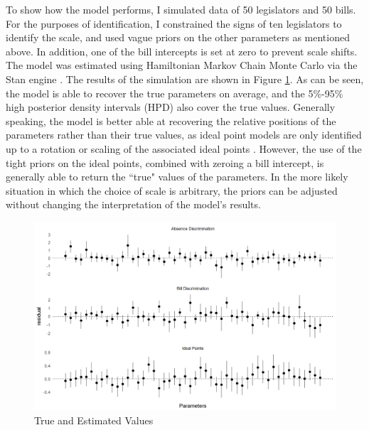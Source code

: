 	To show how the model performs, I simulated data of 50 legislators and 50 bills. For the purposes of identification, I constrained the signs of ten legislators to identify the scale, and used vague priors on the other parameters as mentioned above. In addition, one of the bill intercepts is set at zero to prevent scale shifts. The model was estimated using Hamiltonian Markov Chain Monte Carlo via the Stan engine \parencite{carpenter2017}. The results of the simulation are shown in Figure \ref{sim_results}. As can be seen, the model is able to recover the true parameters on average, and the 5\%-95\% high posterior density intervals (HPD) also cover the true values. Generally speaking, the model is better able at recovering the relative positions of the parameters rather than their true values, as ideal point models are only identified up to a rotation or scaling of the associated ideal points \parencite{gelman2005}. However, the use of the tight priors on the ideal points, combined with zeroing a bill intercept, is generally able to return the ``true" values of the parameters. In the more likely situation in which the choice of scale is arbitrary, the priors can be adjusted without changing the interpretation of the model's results. 
	
	\begin{figure}
		\caption{True and Estimated Values}\label{sim_results}
		\includegraphics[width=\linewidth]{param_resid}
	\end{figure} 
	
